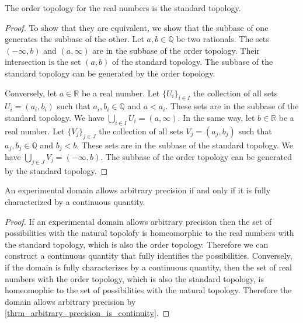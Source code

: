 \documentclass[11pt,letterpaper,fleqn]{memoir} %
\begin{document}
\begin{mathSection}
	\begin{prop}
		The order topology for the real numbers is the standard topology.
	\end{prop}
	\begin{proof}
		To show that they are equivalent, we show that the subbase of one generates the subbase of the other. Let $a,b \in \mathbb{Q}$ be two rationals. The sets $(-\infty, b)$ and $(a, \infty)$ are in the subbase of the order topology. Their intersection is the set $(a, b)$ of the standard topology. The subbase of the standard topology can be generated by the order topology.
		
		Conversely, let $a \in \mathbb{R}$ be a real number. Let $\{U_i\}_{i \in I}$ the collection of all sets $U_i = (a_i, b_i)$ such that $a_i, b_i \in \mathbb{Q}$ and $a < a_i$. These sets are in the subbase of the standard topology. We have $\bigcup\limits_{i \in I} U_i = (a, \infty)$. In the same way, let $b \in \mathbb{R}$ be a real number. Let $\{V_j\}_{j \in J}$ the collection of all sets $V_j = (a_j, b_j)$ such that $a_j, b_j \in \mathbb{Q}$ and $b_j < b$. These sets are in the subbase of the standard topology. We have $\bigcup\limits_{j \in J} V_j = (-\infty, b)$. The subbase of the order topology can be generated by the standard topology.
	\end{proof}
	
	\begin{prop}
		An experimental domain allows arbitrary precision if and only if it is fully characterized by a continuous quantity.
	\end{prop}

	\begin{proof}
		If an experimental domain allows arbitrary precision then the set of possibilities with the natural topolofy is homeomorphic to the real numbers with the standard topology, which is also the order topology. Therefore we can construct a continuous quantity that fully identifies the possibilities. Conversely, if the domain is fully characterizes by a continuous quantity, then the set of real numbers with the order topology, which is also the standard topology, is homeomophic to the set of possibilities with the natural topology. Therefore the domain allows arbitrary precision by \ref{thrm_arbitrary_precision_is_continuity}.
	\end{proof}	
\end{mathSection}
\end{document}
